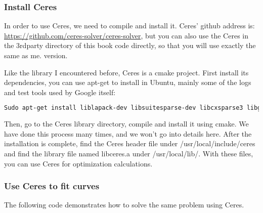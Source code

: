 \subsubsection{Install Ceres}

In order to use Ceres, we need to compile and install it. Ceres' github address is: \url{https://github.com/ceres-solver/ceres-solver}, but you can also use the Ceres in the 3rdparty directory of this book code directly, so that you will use exactly the same as me. version.

Like the library I encountered before, Ceres is a cmake project. First install its dependencies, you can use apt-get to install in Ubuntu, mainly some of the logs and test tools used by Google itself:

\begin{lstlisting}[language=sh,caption=terminal input:]
Sudo apt-get install liblapack-dev libsuitesparse-dev libcxsparse3 libgflags-dev libgoogle-glog-dev libgtest-dev 
\end{lstlisting}

Then, go to the Ceres library directory, compile and install it using cmake. We have done this process many times, and we won't go into details here. After the installation is complete, find the Ceres header file under /usr/local/include/ceres and find the library file named libceres.a under /usr/local/lib/. With these files, you can use Ceres for optimization calculations.

\subsubsection{Use Ceres to fit curves}
The following code demonstrates how to solve the same problem using Ceres.

